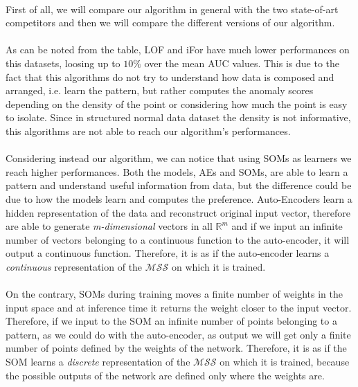 \paragraph{}
First of all, we will compare our algorithm in general with the two state-of-art competitors and then we will compare the different versions of our algorithm.

\paragraph{}
As can be noted from the table, LOF and iFor have much lower performances on this datasets, loosing up to $10\%$ over the mean AUC values. This is due to the fact that this algorithms do not try to understand how data is composed and arranged, i.e. learn the pattern, but rather computes the anomaly scores depending on the density of the point or considering how much the point is easy to isolate. \newline
Since in structured normal data dataset the density is not informative, this algorithms are not able to reach our algorithm's performances.

\paragraph{}
Considering instead our algorithm, we can notice that using SOMs as learners we reach higher performances. Both the models, AEs and SOMs, are able to learn a pattern and understand useful information from data, but the difference could be due to how the models learn and computes the preference. \newline
Auto-Encoders learn a hidden representation of the data and reconstruct original input vector, therefore are able to generate \textit{m-dimensional} vectors in all $\mathbb{R}^m$ and if we input an infinite number of vectors belonging to a continuous function to the auto-encoder, it will output a continuous function. Therefore, it is as if the auto-encoder learns a \textit{continuous} representation of the $\mathcal{MSS}$ on which it is trained.

\paragraph{}
On the contrary, SOMs during training moves a finite number of weights in the input space and at inference time it returns the weight closer to the input vector. Therefore, if we input to the SOM an infinite number of points belonging to a pattern, as we could do with the auto-encoder, as output we will get only a finite number of points defined by the weights of the network. \newline
Therefore, it is as if the SOM learns a \textit{discrete} representation of the $\mathcal{MSS}$ on which it is trained, because the possible outputs of the network are defined only where the weights are.

